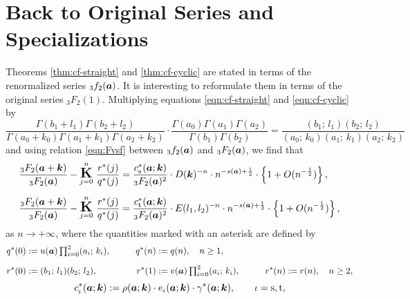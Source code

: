 \documentclass[a4paper,12pt]{article}
\theoremstyle{plain}
\def\rs{\mathrm{s}}
\def\rt{\mathrm{t}}
\def\vG{\varGamma}
\def\ba{\mbox{\boldmath $a$}}
\def\sba{\mbox{\boldmath ${\scriptstyle a}$}}
\def\bk{\mbox{\boldmath $k$}}
\def\cfL{\mbox{\Large \boldmath $\mathrm{K}$}}
\def\ts{\textstyle}
\begin{document}
\section{Back to Original Series and Specializations} \label{sec:bos-s}
Theorems \ref{thm:cf-straight} and \ref{thm:cf-cyclic} are stated in terms of 
the renormalized series ${}_3f_2(\ba)$. 
It is interesting  
to reformulate them in terms of the original series ${}_3F_2(1)$. 
Multiplying equations \eqref{eqn:cf-straight} and \eqref{eqn:cf-cyclic} by   
\[
\frac{\vG(b_1+l_1) \vG(b_2+l_2)}{\vG(a_0+k_0) \vG(a_1+k_1) \vG(a_2+k_2)} 
\cdot \frac{\vG(a_0) \vG(a_1) \vG(a_2)}{\vG(b_1) \vG(b_2)} = 
\frac{(b_1; \, l_1)(b_2; \, l_2)}{(a_0; \, k_0) (a_1; \, k_1) (a_2; \, k_2)}
\]
and using relation \eqref{eqn:Fvsf} between ${}_3f_2(\ba)$ and ${}_3F_2(\ba)$, 
we find that 
\begin{subequations} \label{eqn:cf-o}
\begin{align} 
\frac{{}_3F_2(\ba+\bk)}{{}_3F_2(\ba)} - 
\overset{n}{\underset{j=0}{\cfL}} \,\, \frac{r^*(j)}{q^*(j)} 
&= \dfrac{ c_{\rs}^*(\ba; \bk) }{{}_3F_2(\ba)^2}  
\cdot D(\bk)^{-n} \cdot n^{-s(\sba) + \frac{1}{2} } \cdot 
\left\{ 1 + O (n^{-\frac{1}{2} } ) \right\},  \label{eqn:cf-straight-o} \\[2mm] 
\frac{{}_3F_2(\ba+\bk)}{{}_3F_2(\ba)} - 
\overset{n}{\underset{j=0}{\cfL}} \,\, \frac{r^*(j)}{q^*(j)} 
&= \dfrac{ c_{\rt}^*(\ba; \bk) }{{}_3F_2(\ba)^2}  
\cdot E(l_1, l_2)^{-n} \cdot n^{-s(\sba) + \frac{1}{2} } \cdot 
\left\{ 1 + O (n^{-\frac{1}{2} } ) \right\},  \label{eqn:cf-cyclic-o}
\end{align}
\end{subequations}
as $n \to + \infty$, where the quantities marked with an asterisk are defined by 
\begin{alignat*}{3}
q^*(0)  &:= u(\ba) \ts \prod_{i=0}^2 (a_i; \, k_i), \qquad & 
q^*(n)  &:= q(n), \quad n \ge 1, \qquad &  & \\[2mm]
r^*(0)  &:= (b_1; \, l_1)(b_2; \, l_2), \qquad & 
r^*(1) &:= v(\ba) \ts \prod_{i=0}^2 (a_i; \, k_i), \qquad & 
r^*(n) &:= r(n), \quad n \ge 2, 
\end{alignat*}
\begin{equation} \label{eqn:c*}
c_{\iota}^*(\ba; \bk)  := \rho(\ba; \bk) \cdot e_{\iota}(\ba; \bk) \cdot 
\gamma^*(\ba; \bk), \qquad  \iota = \rs, \rt,  
\end{equation}
\end{document}
